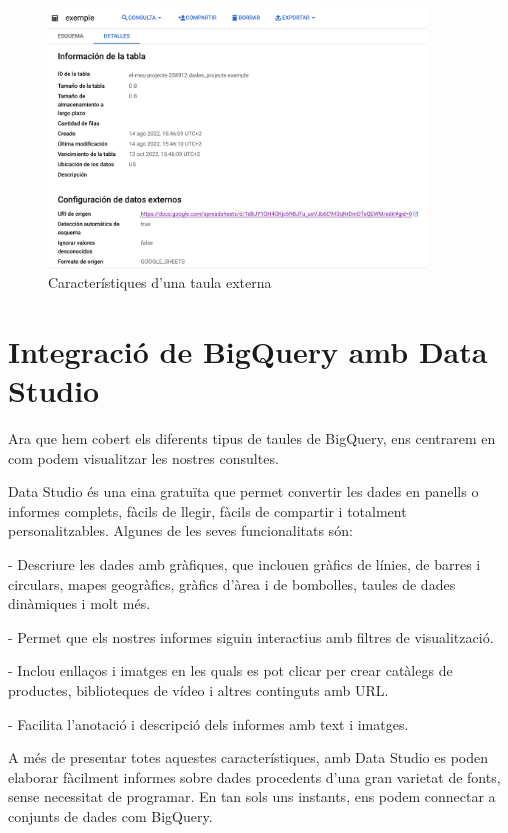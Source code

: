 \documentclass[11pt,longbibliography]{article}
\theoremstyle{definition}
\theoremstyle{remark}
\begin{document}
\begin{figure}[h!]
\begin{center}
\includegraphics[width=10cm]{bq25}
\end{center}
\caption{Característiques d'una taula externa}
\label{fig:bq25}
\end{figure}


\newpage

\section{Integració de BigQuery amb Data Studio}

Ara que hem cobert els diferents tipus de taules de BigQuery, ens centrarem en com podem visualitzar les nostres consultes. 


Data Studio és una eina gratuïta que permet convertir les dades en panells o informes complets, fàcils de llegir, fàcils de compartir i totalment personalitzables. Algunes de les seves funcionalitats són:


- Descriure les dades amb gràfiques, que inclouen gràfics de línies, de barres i circulars, mapes geogràfics, gràfics d’àrea i de bombolles, taules de dades dinàmiques i molt més.


- Permet que els nostres informes siguin interactius amb filtres de visualització.


- Inclou enllaços i imatges en les quals es pot clicar per crear catàlegs de productes, biblioteques de vídeo i altres continguts amb URL.


- Facilita l’anotació i descripció dels informes amb text i imatges.


A més de presentar totes aquestes característiques, amb Data Studio es poden elaborar fàcilment informes sobre dades procedents d’una gran varietat de fonts, sense necessitat de programar. En tan sols uns instants, ens podem connectar a conjunts de dades com BigQuery.
\end{document}
